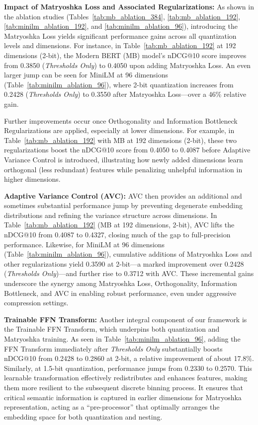 \textbf{Impact of Matryoshka Loss and Associated Regularizations:} 
As shown in the ablation studies (Tables~\ref{tab:mb_ablation_384}, \ref{tab:mb_ablation_192}, \ref{tab:minilm_ablation_192}, and \ref{tab:minilm_ablation_96}), introducing the Matryoshka Loss yields significant performance gains across all quantization levels and dimensions. For instance, in Table~\ref{tab:mb_ablation_192} at 192 dimensions (2-bit), the Modern BERT (MB) model's nDCG@10 score improves from 0.3850 (\textit{Thresholds Only}) to 0.4050 upon adding Matryoshka Loss. An even larger jump can be seen for MiniLM at 96 dimensions (Table~\ref{tab:minilm_ablation_96}), where 2-bit quantization increases from 0.2428 (\textit{Thresholds Only}) to 0.3550 after Matryoshka Loss—over a 46\% relative gain.

Further improvements occur once Orthogonality and Information Bottleneck Regularizations are applied, especially at lower dimensions. For example, in Table~\ref{tab:mb_ablation_192} with MB at 192 dimensions (2-bit), these two regularizations boost the nDCG@10 score from 0.4050 to 0.4087 before Adaptive Variance Control is introduced, illustrating how newly added dimensions learn orthogonal (less redundant) features while penalizing unhelpful information in higher dimensions.

\noindent
\textbf{Adaptive Variance Control (AVC):}
AVC then provides an additional and sometimes substantial performance jump by preventing degenerate embedding distributions and refining the variance structure across dimensions. In Table~\ref{tab:mb_ablation_192} (MB at 192 dimensions, 2-bit), AVC lifts the nDCG@10 from 0.4087 to 0.4327, closing much of the gap to full-precision performance. Likewise, for MiniLM at 96 dimensions (Table~\ref{tab:minilm_ablation_96}), cumulative additions of Matryoshka Loss and other regularizations yield 0.3590 at 2-bit—a marked improvement over 0.2428 (\textit{Thresholds Only})—and further rise to 0.3712 with AVC. These incremental gains underscore the synergy among Matryoshka Loss, Orthogonality, Information Bottleneck, and AVC in enabling robust performance, even under aggressive compression settings.

\noindent
\textbf{Trainable FFN Transform:}
Another integral component of our framework is the Trainable FFN Transform, which underpins both quantization and Matryoshka training. As seen in Table~\ref{tab:minilm_ablation_96}, adding the FFN Transform immediately after \textit{Thresholds Only} substantially boosts nDCG@10 from 0.2428 to 0.2860 at 2-bit, a relative improvement of about 17.8\%. Similarly, at 1.5-bit quantization, performance jumps from 0.2330 to 0.2570. This learnable transformation effectively redistributes and enhances features, making them more resilient to the subsequent discrete binning process. It ensures that critical semantic information is captured in earlier dimensions for Matryoshka representation, acting as a “pre-processor” that optimally arranges the embedding space for both quantization and nesting.

